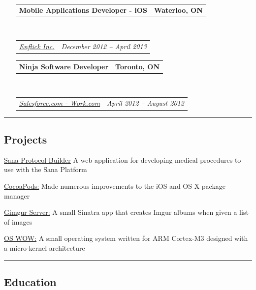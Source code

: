 \documentclass[10pt,letterpaper]{article}
\makeatletter
\newenvironment{indentsection}[1]%
{\begin{list}{}%
	{\setlength{\leftmargin}{#1}}%
	\item[]%
}
{\end{list}}
\newcommand{\headerrow}[2]
{\begin{tabular*}{\linewidth}{l@{\extracolsep{\fill}}r}
	#1 &
	#2 \\
\end{tabular*}}
\makeatother
\begin{document}
\begin{itemize}[leftmargin=*]
	\item[]
	\headerrow
		{\textbf{Mobile Applications Developer - iOS}}
		{\textbf{Waterloo, ON}}
	\\
	\headerrow
		{\emph{\href{https://www.enflick.com}{Enflick Inc.}}}
		{\emph{December 2012 -- April 2013}}

	\item[]
	\headerrow
		{\textbf{Ninja Software Developer}}
		{\textbf{Toronto, ON}}
	\\
	\headerrow
		{\emph{\href{https://www.work.com}{Salesforce.com - Work.com}}}
		{\emph{April 2012 -- August 2012}}
\end{itemize}

\hrule
\vspace{-0.4em}
\subsection*{Projects}
	\begin{indentsection}{\parindent}
	\begin{description*}
	    \item[\href{https://github.com/SanaMobile/sana.protocol_builder}{Sana Protocol Builder}] A web application for developing medical procedures to use with the Sana Platform
	    \item[\href{https://github.com/CocoaPods}{CocoaPods:}] Made numerous improvements to the iOS and OS X package manager
		\item[\href{https://github.com/Kapin/gimgur-server}{Gimgur Server:}] A small Sinatra app that creates Imgur albums when given a list of images
		\item[\href{https://github.com/Trinovantes/se350-project}{OS WOW:}] A small operating system written for ARM Cortex-M3 designed with a micro-kernel architecture
	\end{description*}
	\end{indentsection}

\hrule
\vspace{-0.4em}
\subsection*{Education}
\end{document}
